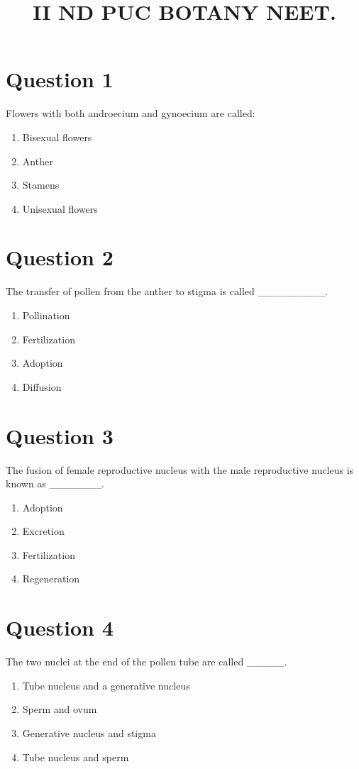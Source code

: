\documentclass{article}
\title{II ND PUC BOTANY NEET.}
\begin{document}
                    \maketitle
                    \section*{Question 1}
Flowers with both androecium and gynoecium are called:
\begin{enumerate}[label=(\alph*)]
\item Bisexual flowers
\item Anther
\item Stamens
\item Unisexual flowers
\end{enumerate}
\newpage
\section*{Question 2}
The transfer of pollen from the anther to stigma is called _________.\newline
\begin{enumerate}[label=(\alph*)]
\item Pollination
\item Fertilization
\item Adoption
\item Diffusion
\end{enumerate}
\newpage
\section*{Question 3}
The fusion of female reproductive nucleus with the male reproductive nucleus is known as _______.
\begin{enumerate}[label=(\alph*)]
\item Adoption
\item Excretion
\item Fertilization
\item Regeneration
\end{enumerate}
\newpage
\section*{Question 4}
The two nuclei at the end of the pollen tube are called _____.
\begin{enumerate}[label=(\alph*)]
\item Tube nucleus and a generative nucleus
\item Sperm and ovum
\item Generative nucleus and stigma
\item Tube nucleus and sperm
\end{enumerate}
\newpage
\end{document}
